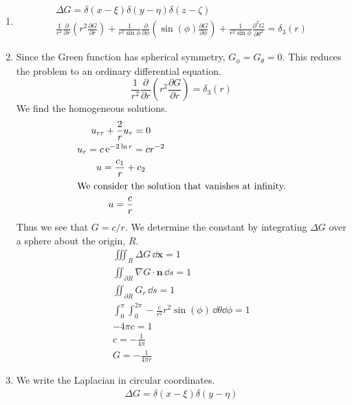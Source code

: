 {\begin{Solution}
  \begin{enumerate} 
  \item 
    \begin{gather*}
      \Delta G = \delta(x-\xi) \delta(y-\eta) \delta(z-\zeta)
      \\
      \frac{1}{r^2} \frac{\partial}{\partial r} \left( r^2 \frac{\partial G}{\partial r} \right)
      + \frac{1}{r^2 \sin \phi} \frac{\partial}{\partial \phi} \left( \sin(\phi) \frac{\partial G}{\partial \phi} \right)
      + \frac{1}{r^2 \sin \phi} \frac{\partial^2 G}{\partial \theta^2}
      = \delta_3(r)
    \end{gather*}
  \item 
    Since the Green function has spherical symmetry, $G_\phi = G_\theta = 0$.
    This reduces the problem to an ordinary differential equation.
    \[
    \frac{1}{r^2} \frac{\partial}{\partial r} \left( r^2 \frac{\partial G}{\partial r} \right) = \delta_3(r)
    \]
    We find the homogeneous solutions.
    \begin{gather*}
      u_{r r} + \frac{2}{r} u_r = 0
      \\
      u_r = c \mathop{\mathrm{e}}\nolimits^{-2 \ln r} = c r^{-2}
      \\
      u = \frac{c_1}{r} + c_2
      \\
      \intertext{We consider the solution that vanishes at infinity.}
      u = \frac{c}{r}
    \end{gather*}
    Thus we see that $G = c / r$.  We determine the constant by integrating
    $\Delta G$ over a sphere about the origin, $R$.
    \begin{gather*}
      \iiint_R \Delta G \,\dd \mathbf{x} = 1
      \\
      \iint_{\partial R} \nabla G \cdot \mathbf{n} \,\dd s = 1
      \\
      \iint_{\partial R} G_r \,\dd s = 1
      \\
      \int_0^\pi \int_0^{2 \pi} - \frac{c}{r^2} r^2 \sin(\phi) \,\dd \theta \dd \phi = 1
      \\
      - 4 \pi c = 1
      \\
      c = - \frac{1}{4 \pi}
      \\
      \boxed{
        G = - \frac{1}{4 \pi r}
        }
    \end{gather*}
  \item 
    We write the Laplacian in circular coordinates.
    \begin{gather*}
      \Delta G = \delta(x-\xi) \delta(y-\eta)

\end{gather*}
\end{enumerate}
\end{Solution}}
